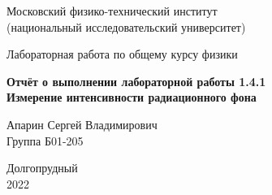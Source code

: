 



\begin{titlepage}

    \newpage
    \begin{center}
        \normalsize Московский физико-технический институт \\(национальный исследовательский университет)
    \end{center}

    \vspace{6em}

    \begin{center}
        \Large Лабораторная работа по общему курсу физики\\
    \end{center}

    \vspace{1em}

    \begin{center}
        \Large \textbf{Отчёт о выполнении лабораторной работы 1.4.1\\ {Измерение интенсивности радиационного фона}}
    \end{center}

    \vspace{2em}

    \begin{center}
        \large Апарин Сергей Владимирович \\
        Группа Б01-205
    \end{center}

    \vspace{\fill}

    \begin{center}
        Долгопрудный \\2022
    \end{center}

\end{titlepage}


